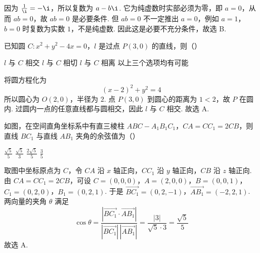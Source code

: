 
\begin{solution}
因为 \(\frac{1}{\i}=-\i\)，所以复数为 \(a-b\i\). 它为纯虚数时实部必须为零，即 \(a=0\)，从而 \(ab=0\)，故 \(ab=0\) 是必要条件.
但 \(ab=0\) 不一定推出 \(a=0\)，例如 \(a=1\)，\(b=0\) 时复数为实数 \(1\)，不是纯虚数. 因此这是必要不充分条件，故选 B.
\end{solution}

\begin{problem}
已知圆 \(C: x^{2} + y^{2} - 4x = 0\)，\(l\) 是过点 \(P(3,0)\) 的直线，则（\quad）

\choices
    {\(l\) 与 \(C\) 相交}
    {\(l\) 与 \(C\) 相切}
    {\(l\) 与 \(C\) 相离}
    {以上三个选项均有可能}
\end{problem}


\begin{solution}
将圆方程化为
\[
(x-2)^2+y^2=4
\]
所以圆心为 \(O(2,0)\)，半径为 \(2\). 点 \(P(3,0)\) 到圆心的距离为 \(1<2\)，故 \(P\) 在圆内. 过圆内一点的任意直线都与圆相交，因此 \(l\) 与 \(C\) 相交.
故选 A.
\end{solution}

\begin{problem}
如图，在空间直角坐标系中有直三棱柱 \(ABC - A_{1}B_{1}C_{1}\)，\(CA = CC_{1} = 2CB\)，则直线 \(BC_{1}\) 与直线 \(AB_{1}\) 夹角的余弦值为（\quad）


\choices
    {\(\frac{\sqrt{5}}{5}\)}
    {\( \frac{\sqrt{5}}{3} \)}
    {\( \frac{2\sqrt{5}}{5} \)}
    {\(\frac{3}{5}\)}
\end{problem}


\begin{solution}
取图中坐标原点为 \(C\)，令 \(CA\) 沿 \(x\) 轴正向，\(CC_1\) 沿 \(y\) 轴正向，\(CB\) 沿 \(z\) 轴正向. 由 \(CA=CC_1=2CB\)，可设
\(C=(0,0,0)\)，\(A=(2,0,0)\)，\(B=(0,0,1)\)，\(C_1=(0,2,0)\)，\(B_1=(0,2,1)\).
于是
\(\overrightarrow{BC_1}=(0,2,-1)\)，\(\overrightarrow{AB_1}=(-2,2,1)\).
两向量的夹角 \(\theta\) 满足
\[
\cos\theta=\frac{\left|\overrightarrow{BC_1}\cdot\overrightarrow{AB_1}\right|}
{|\overrightarrow{BC_1}|\,|\overrightarrow{AB_1}|}
=\frac{|3|}{\sqrt5\cdot3}=\frac{\sqrt5}{5}
\]
故选 A.
\end{solution}

